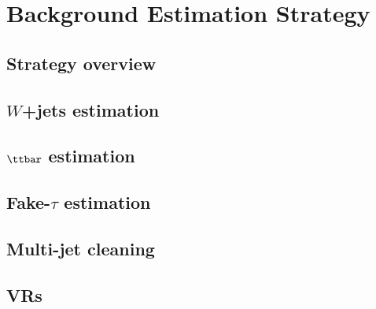 \chapter{Background Estimation Strategy}
\label{chapter:background_estimation}

\section{Strategy overview}
\section{$W$+jets estimation}
\section{$\ttbar$ estimation}
\section{Fake-$\tau$ estimation}
\section{Multi-jet cleaning}
\section{VRs}
